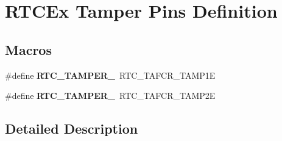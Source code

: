 \hypertarget{group___r_t_c_ex___tamper___pins___definitions}{}\section{R\+T\+C\+Ex Tamper Pins Definition}
\label{group___r_t_c_ex___tamper___pins___definitions}
\subsection*{Macros}
\begin{DoxyCompactItemize}
\item 
\mbox{\label{group___r_t_c_ex___tamper___pins___definitions_ga339f9515dea38efe31fbae679887c7b5}} 
\#define {\bfseries R\+T\+C\+\_\+\+T\+A\+M\+P\+E\+R\+\_}~R\+T\+C\+\_\+\+T\+A\+F\+C\+R\+\_\+\+T\+A\+M\+P1E
\item 
\mbox{\label{group___r_t_c_ex___tamper___pins___definitions_gaca7aa22d4151651fe8c7d272ed1749f9}} 
\#define {\bfseries R\+T\+C\+\_\+\+T\+A\+M\+P\+E\+R\+\_}~R\+T\+C\+\_\+\+T\+A\+F\+C\+R\+\_\+\+T\+A\+M\+P2E
\end{DoxyCompactItemize}


\subsection{Detailed Description}
